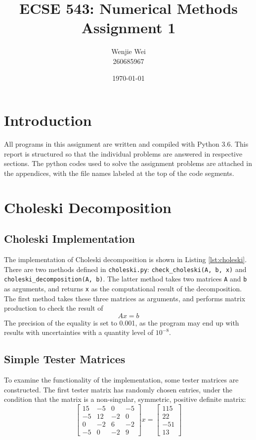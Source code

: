 \documentclass[a4paper,titlepage]{article}
\title{\textbf{ECSE 543: Numerical Methods} \\ Assignment 1}
\author{Wenjie Wei \\ 260685967}
\date{\today}
\begin{document}
	\sloppy
	\maketitle
	
	\tableofcontents
	
	
	\twocolumn
	
	\section{Introduction}
	
	All programs in this assignment are written and compiled with Python 3.6. This report is structured so that the individual problems are answered in respective sections. The python codes used to solve the assignment problems are attached in the appendices, with the file names labeled at the top of the code segments.
	
	\section{Choleski Decomposition}
		\subsection{Choleski Implementation}
			The implementation of Choleski decomposition is shown in Listing \ref{lst:choleski}. There are two methods defined in \texttt{choleski.py}: \texttt{check_choleski(A, b, x)} and \texttt{choleski_decomposition(A, b)}. The latter method takes two matrices \texttt{A} and \texttt{b} as arguments, and returns \texttt{x} as the computational result of the decomposition. The first method takes these three matrices as arguments, and performs matrix production to check the result of
			$$
				Ax = b
			$$ 
			The precision of the equality is set to 0.001, as the program may end up with results with uncertainties with a quantity level of $10^{-8}$.
			
		\subsection{Simple Tester Matrices}
			To examine the functionality of the implementation, some tester matrices are constructed. The first tester matrix has randomly chosen entries, under the condition that the matrix is a non-singular, symmetric, positive definite matrix:
			$$
				\begin{bmatrix}
					15 & -5 & 0 & -5 \\
					-5 & 12 & -2 & 0 \\
					0 & -2 & 6 & -2 \\
					-5 & 0 & -2 & 9
				\end{bmatrix} x =
				\begin{bmatrix}
					115\\
					22\\
					-51\\
					13
				\end{bmatrix}
			$$
			
\end{document}
